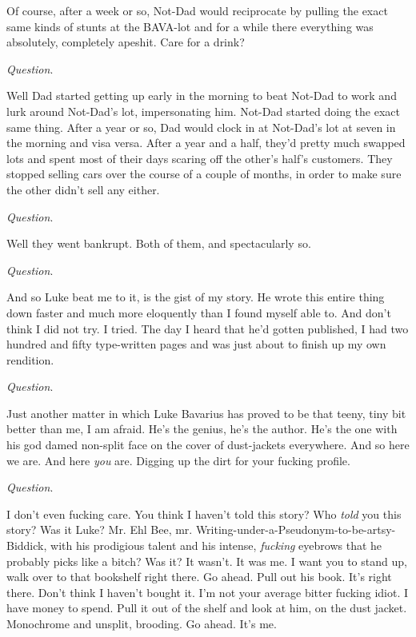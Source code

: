 Of course, after a week or so, Not-Dad would reciprocate by pulling
the exact same kinds of stunts at the BAVA-lot and for a while
there everything was absolutely, completely apeshit. Care for a
drink?



{\em Question}.



Well Dad started getting up early in the morning to beat Not-Dad to
work and lurk around Not-Dad's lot, impersonating him.
Not-Dad started doing the exact same thing. After a year or so, Dad
would clock in at Not-Dad's lot at seven in the morning and
visa versa. After a year and a half, they'd pretty much
swapped lots and spent most of their days scaring off the other's
half's customers. They stopped selling cars over the course of a
couple of months, in order to make sure the other didn't sell any
either.



{\em Question}.



Well they went bankrupt. Both of them, and spectacularly so.



{\em Question}.



And so Luke beat me to it, is the gist of my story. He wrote this
entire thing down faster and much more eloquently than I found
myself able to. And don't think I did not try. I tried. The
day I heard that he'd gotten published, I had two hundred and
fifty type-written pages and was just about to finish up my own
rendition.



{\em Question}.



Just another matter in which Luke Bavarius has proved to be that
teeny, tiny bit better than me, I am afraid. He's the genius,
he's the author. He's the one with his god damed
non-split face on the cover of dust-jackets everywhere. And so here
we are. And here {\em you} are. Digging up the dirt for your
fucking profile.



{\em Question}.



I don't even fucking care. You think I haven't told
this story? Who {\em told} you this story? Was it Luke? Mr. Ehl
Bee, mr. Writing-under-a-Pseudonym-to-be-artsy-Biddick, with his
prodigious talent and his intense, {\em fucking} eyebrows that he
probably picks like a bitch? Was it? It wasn't. It was me. I
want you to stand up, walk over to that bookshelf right there. Go
ahead. Pull out his book. It's right there. Don't think
I haven't bought it. I'm not your average bitter fucking
idiot. I have money to spend. Pull it out of the shelf and look at
him, on the dust jacket. Monochrome and unsplit, brooding. Go
ahead. It's me.

